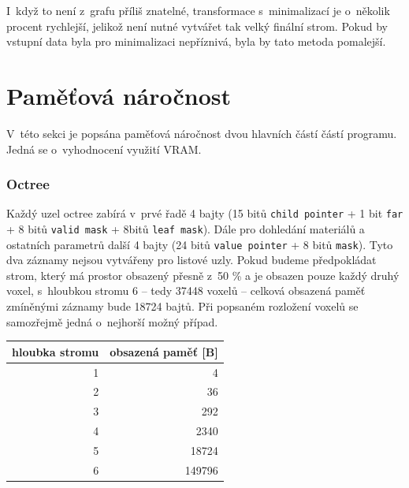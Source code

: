 I~když to není z~grafu příliš znatelné, transformace s~minimalizací je o~několik procent rychlejší, jelikož není nutné vytvářet tak velký finální strom. Pokud by vstupní data byla pro minimalizaci nepříznivá, byla by tato metoda pomalejší.

\section{Paměťová náročnost}
V~této sekci je popsána paměťová náročnost dvou hlavních částí částí programu. Jedná se o~vyhodnocení využití VRAM.

\subsubsection{Octree}

Každý uzel octree zabírá v~prvé řadě 4 bajty (15 bitů \texttt{child pointer} + 1 bit \texttt{far} + 8 bitů \texttt{valid mask} + 8bitů \texttt{leaf mask}). Dále pro dohledání materiálů a ostatních parametrů další 4 bajty (24 bitů \texttt{value pointer} + 8 bitů \texttt{mask}). Tyto dva záznamy nejsou vytvářeny pro listové uzly. Pokud budeme předpokládat strom, který má prostor obsazený přesně z~50 \% a je obsazen pouze každý druhý voxel, s~hloubkou stromu 6 -- tedy 37448 voxelů -- celková obsazená paměť zmíněnými záznamy bude 18724 bajtů. Při popsaném rozložení voxelů se samozřejmě jedná o~nejhorší možný případ.

\begin{table}[H]
	\centering
	\begin{tabular}{|r|r|}
		\hline
		\multicolumn{1}{|c|}{hloubka stromu} & \multicolumn{1}{c|}{obsazená paměť {[}B{]}} \\ \hline
		1                                    & 4                                           \\ \hline
		2                                    & 36                                          \\ \hline
		3                                    & 292                                         \\ \hline
		4                                    & 2340                                        \\ \hline
		5                                    & 18724                                       \\ \hline
		6                                    & 149796                                      \\ \hline
	\end{tabular}
	\captionsetup{justification=centering}
\end{table}

